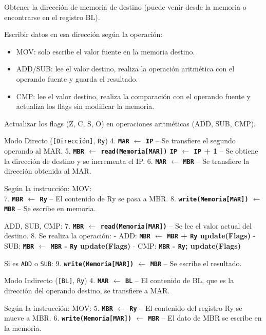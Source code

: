 \documentclass[12pt,oneside]{templates/unerthesis}
\begin{document}
Obtener la dirección de memoria de destino (puede venir desde la memoria o encontrarse en el registro BL).

Escribir datos en esa dirección según la operación:

\begin{itemize}
\item
  MOV: solo escribe el valor fuente en la memoria destino.
\item
  ADD/SUB: lee el valor destino, realiza la operación aritmética con el operando fuente y guarda el resultado.
\item
  CMP: lee el valor destino, realiza la comparación con el operando fuente y actualiza los flags sin modificar la memoria.
\end{itemize}

Actualizar los flags (Z, C, S, O) en operaciones aritméticas (ADD, SUB, CMP).

Modo Directo (\texttt{{[}Dirección{]}}, \texttt{Ry})
4. \textbf{\texttt{MAR} \(\leftarrow\) \texttt{IP}} -- Se transfiere el segundo operando al MAR.
5. \textbf{\texttt{MBR} \(\leftarrow\) \texttt{read(Memoria{[}MAR{]})} \textbar{} \texttt{IP} \(\leftarrow\) \texttt{IP} + 1} -- Se obtiene la dirección de destino y se incrementa el IP.
6. \textbf{\texttt{MAR} \(\leftarrow\) \texttt{MBR}} -- Se transfiere la dirección obtenida al MAR.

Según la instrucción:
MOV:\\
7. \textbf{\texttt{MBR} \(\leftarrow\) \texttt{Ry}} -- El contenido de Ry se pasa a MBR.
8. \textbf{\texttt{write(Memoria{[}MAR{]})} \(\leftarrow\) \texttt{MBR}} -- Se escribe en memoria.

ADD, SUB, CMP:
7. \textbf{\texttt{MBR} \(\leftarrow\) \texttt{read(Memoria{[}MAR{]})}} -- Se lee el valor actual del destino.
8. Se realiza la operación:
- ADD: \textbf{\texttt{MBR} \(\leftarrow\) \texttt{MBR} + \texttt{Ry} \textbar{} update(Flags)}
- SUB: \textbf{\texttt{MBR} \(\leftarrow\) \texttt{MBR} - \texttt{Ry} \textbar{} update(Flags)}
- CMP: \textbf{\texttt{MBR} - \texttt{Ry}; update(Flags)}

Si es \texttt{ADD} o \texttt{SUB}:
9. \textbf{\texttt{write(Memoria{[}MAR{]})} \(\leftarrow\) \texttt{MBR}} -- Se escribe el resultado.

Modo Indirecto (\texttt{{[}BL{]}}, \texttt{Ry})
4. \textbf{\texttt{MAR} \(\leftarrow\) \texttt{BL}} -- El contenido de BL, que es la dirección del operando destino, se transfiere a MAR.

Según la instrucción:
MOV:
5. \textbf{\texttt{MBR} \(\leftarrow\) \texttt{Ry}} -- El contenido del registro Ry se mueve a MBR.
6. \textbf{\texttt{write(Memoria{[}MAR{]})} \(\leftarrow\) \texttt{MBR}} -- El dato de MBR se escribe en la memoria.
\end{document}
